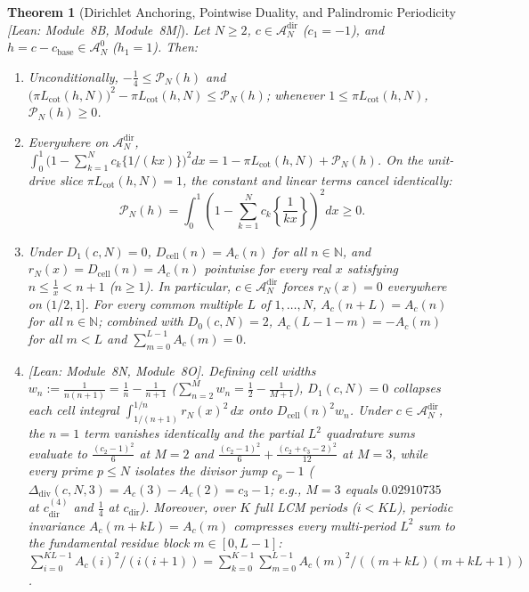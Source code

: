 \documentclass[10pt,a4paper]{article}
\newtheorem{theorem}{Theorem}[section]
\theoremstyle{definition}
\begin{document}
\begin{theorem}[Dirichlet Anchoring, Pointwise Duality, and Palindromic Periodicity \emph{[Lean: Module~8B, Module~8M]}]\label{thm:dirichlet}
Let $N \ge 2$, $c \in \mathcal{A}_N^{\mathrm{dir}}$ ($c_1 = -1$), and $h = c - c_{\mathrm{base}} \in \mathcal{A}_N^0$ ($h_1 = 1$). Then:
\begin{enumerate}[leftmargin=1.8em,itemsep=2pt]
\item Unconditionally, $-\tfrac{1}{4} \le \mathcal{P}_N(h)$ and $\bigl(\pi L_{\mathrm{cot}}(h,N)\bigr)^2 - \pi L_{\mathrm{cot}}(h,N) \le \mathcal{P}_N(h)$; whenever $1 \le \pi L_{\mathrm{cot}}(h,N)$, $\mathcal{P}_N(h) \ge 0$.
\item Everywhere on $\mathcal{A}_N^{\mathrm{dir}}$, $\int_0^1 \bigl(1 - \sum_{k=1}^N c_k \{1/(kx)\}\bigr)^2 dx = 1 - \pi L_{\mathrm{cot}}(h,N) + \mathcal{P}_N(h)$. On the unit-drive slice $\pi L_{\mathrm{cot}}(h,N) = 1$, the constant and linear terms cancel identically:
\begin{equation}\label{eq:unit_dir_energy}
\mathcal{P}_N(h) = \int_0^1 \left(1 - \sum_{k=1}^N c_k \left\{\frac{1}{kx}\right\}\right)^{\!2} dx \ge 0.
\end{equation}
\item Under $D_1(c,N) = 0$, $D_{\mathrm{cell}}(n) = A_c(n)$ for all $n \in \mathbb{N}$, and $r_N(x) = D_{\mathrm{cell}}(n) = A_c(n)$ pointwise for every real $x$ satisfying $n \le \tfrac{1}{x} < n+1$ ($n \ge 1$). In particular, $c \in \mathcal{A}_N^{\mathrm{dir}}$ forces $r_N(x) = 0$ everywhere on $(1/2, 1]$. For every common multiple $L$ of $1,\dots,N$, $A_c(n+L) = A_c(n)$ for all $n \in \mathbb{N}$; combined with $D_0(c,N) = 2$, $A_c(L - 1 - m) = -A_c(m)$ for all $m < L$ and $\sum_{m=0}^{L-1} A_c(m) = 0$.
\item \emph{[Lean: Module~8N, Module~8O].} Defining cell widths $w_n := \frac{1}{n(n+1)} = \frac{1}{n} - \frac{1}{n+1}$ ($\sum_{n=2}^M w_n = \frac{1}{2} - \frac{1}{M+1}$), $D_1(c,N) = 0$ collapses each cell integral $\int_{1/(n+1)}^{1/n} r_N(x)^2\,dx$ onto $D_{\mathrm{cell}}(n)^2 w_n$. Under $c \in \mathcal{A}_N^{\mathrm{dir}}$, the $n=1$ term vanishes identically and the partial $L^2$ quadrature sums evaluate to $\frac{(c_2-1)^2}{6}$ at $M=2$ and $\frac{(c_2-1)^2}{6} + \frac{(c_2+c_3-2)^2}{12}$ at $M=3$, while every prime $p \le N$ isolates the divisor jump $c_p - 1$ ($\Delta_{\mathrm{div}}(c,N,3) = A_c(3) - A_c(2) = c_3 - 1$; e.g., $M=3$ equals $0.02910735$ at $c_{\mathrm{dir}}^{(4)}$ and $\frac{1}{4}$ at $c_{\mathrm{dir}}$). Moreover, over $K$ full LCM periods ($i < K L$), periodic invariance $A_c(m+kL)=A_c(m)$ compresses every multi-period $L^2$ sum to the fundamental residue block $m \in [0, L-1]$: $\sum_{i=0}^{KL-1} A_c(i)^2/(i(i+1)) = \sum_{k=0}^{K-1}\sum_{m=0}^{L-1} A_c(m)^2/((m+kL)(m+kL+1))$.

\end{enumerate}
\end{theorem}
\end{document}
